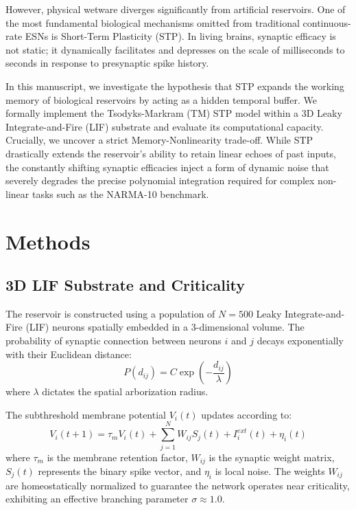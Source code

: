 \documentclass[12pt, a4paper]{article}
\begin{document}
However, physical wetware diverges significantly from artificial reservoirs. One of the most fundamental biological mechanisms omitted from traditional continuous-rate ESNs is Short-Term Plasticity (STP). In living brains, synaptic efficacy is not static; it dynamically facilitates and depresses on the scale of milliseconds to seconds in response to presynaptic spike history. 

In this manuscript, we investigate the hypothesis that STP expands the working memory of biological reservoirs by acting as a hidden temporal buffer. We formally implement the Tsodyks-Markram (TM) STP model within a 3D Leaky Integrate-and-Fire (LIF) substrate and evaluate its computational capacity. Crucially, we uncover a strict Memory-Nonlinearity trade-off. While STP drastically extends the reservoir's ability to retain linear echoes of past inputs, the constantly shifting synaptic efficacies inject a form of dynamic noise that severely degrades the precise polynomial integration required for complex non-linear tasks such as the NARMA-10 benchmark.

\section{Methods}

\subsection{3D LIF Substrate and Criticality}
The reservoir is constructed using a population of $N=500$ Leaky Integrate-and-Fire (LIF) neurons spatially embedded in a 3-dimensional volume. The probability of synaptic connection between neurons $i$ and $j$ decays exponentially with their Euclidean distance:
\begin{equation}
P(d_{ij}) = C \exp\left(-\frac{d_{ij}}{\lambda}\right)
\end{equation}
where $\lambda$ dictates the spatial arborization radius. 

The subthreshold membrane potential $V_i(t)$ updates according to:
\begin{equation}
V_i(t+1) = \tau_m V_i(t) + \sum_{j=1}^N W_{ij} S_j(t) + I_i^{ext}(t) + \eta_i(t)
\end{equation}
where $\tau_m$ is the membrane retention factor, $W_{ij}$ is the synaptic weight matrix, $S_j(t)$ represents the binary spike vector, and $\eta_i$ is local noise. The weights $W_{ij}$ are homeostatically normalized to guarantee the network operates near criticality, exhibiting an effective branching parameter $\sigma \approx 1.0$.
\end{document}
